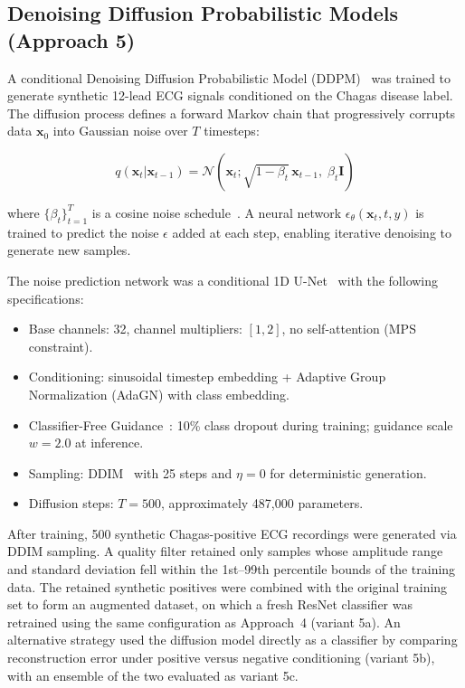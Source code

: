 \subsection{Denoising Diffusion Probabilistic Models (Approach 5)}
\label{sec:ddpm}

A conditional Denoising Diffusion Probabilistic Model (DDPM)~\cite{ho2020denoising} was trained to generate synthetic 12-lead ECG signals conditioned on the Chagas disease label. The diffusion process defines a forward Markov chain that progressively corrupts data $\mathbf{x}_0$ into Gaussian noise over $T$ timesteps:

\begin{equation}
    q(\mathbf{x}_t | \mathbf{x}_{t-1}) = \mathcal{N}(\mathbf{x}_t; \sqrt{1 - \beta_t}\, \mathbf{x}_{t-1},\; \beta_t \mathbf{I})
\end{equation}

where $\{\beta_t\}_{t=1}^{T}$ is a cosine noise schedule~\cite{nichol2021improved}. A neural network $\epsilon_\theta(\mathbf{x}_t, t, y)$ is trained to predict the noise $\epsilon$ added at each step, enabling iterative denoising to generate new samples.

The noise prediction network was a conditional 1D U-Net~\cite{ronneberger2015unet} with the following specifications:

\begin{itemize}
    \item Base channels: 32, channel multipliers: $[1, 2]$, no self-attention (MPS constraint).
    \item Conditioning: sinusoidal timestep embedding + Adaptive Group Normalization (AdaGN) with class embedding.
    \item Classifier-Free Guidance~\cite{ho2022classifierfree}: 10\% class dropout during training; guidance scale $w = 2.0$ at inference.
    \item Sampling: DDIM~\cite{song2021denoising} with 25 steps and $\eta = 0$ for deterministic generation.
    \item Diffusion steps: $T = 500$, approximately 487,000 parameters.
\end{itemize}

After training, 500 synthetic Chagas-positive ECG recordings were generated via DDIM sampling. A quality filter retained only samples whose amplitude range and standard deviation fell within the 1st--99th percentile bounds of the training data. The retained synthetic positives were combined with the original training set to form an augmented dataset, on which a fresh ResNet classifier was retrained using the same configuration as Approach~4 (variant 5a). An alternative strategy used the diffusion model directly as a classifier by comparing reconstruction error under positive versus negative conditioning (variant 5b), with an ensemble of the two evaluated as variant 5c.

